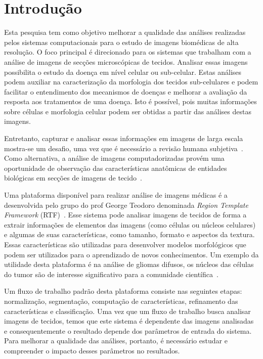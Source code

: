 \documentclass[a4paper,10pt]{article}
\begin{document}
	
	
\section{Introdução}\label{introducao}


Esta pesquisa tem como objetivo melhorar a qualidade das análises realizadas
pelos sistemas computacionais para o estudo de imagens biomédicas de alta
resolução. O foco principal é direcionado para os sistemas que trabalham com a
análise de imagens de secções microscópicas de tecidos. Analisar essas imagens
possibilita o estudo da doença em nível celular ou sub-celular. Estas análises
podem auxiliar na caracterização da morfologia dos tecidos sub-celulares e
podem facilitar o entendimento dos mecanismos de doenças e melhorar a avaliação
da resposta aos tratamentos de uma doença. Isto é possível, pois muitas
informações sobre células e morfologia celular podem ser obtidas a partir das
análises destas imagens.

Entretanto, capturar e analisar essas informações em imagens de larga escala
mostra-se um desafio, uma vez que é necessário a revisão humana
subjetiva~\cite{kong2011comprehensive}. Como alternativa, a análise de imagens
computadorizadas provém uma oportunidade de observação das características
anatômicas de entidades biológicas em secções de imagens de
tecido~\cite{kong2010texture}.

Uma plataforma disponível para realizar análise de imagens médicas é a
desenvolvida pelo grupo do prof George Teodoro denominada \textit{Region
Template Framework} (RTF)~\cite{teodoro2014region}. Esse sistema pode analisar
imagens de tecidos de forma a extrair informações de elementos das imagens
(como células ou núcleos celulares) e algumas de suas características, como
tamanho, formato e aspectos da textura. Essas características são utilizadas
para desenvolver modelos morfológicos que podem ser utilizados para o
aprendizado de novos conhecimentos. Um exemplo da utilidade desta plataforma é
na análise de gliomas difusos, os núcleos das células do tumor são de interesse
significativo para a comunidade científica~\cite{gupta2005clarifying}.

Um fluxo de trabalho padrão desta plataforma consiste nas seguintes etapas: normalização, segmentação, computação de características, refinamento das características e classificação. Uma vez que um fluxo de trabalho busca analisar imagens de tecidos, temos que este sistema é dependente das imagens analisadas e consequentemente o resultado depende dos parâmetros de entrada do sistema. Para melhorar a qualidade das análises, portanto, é necessário estudar e compreender o impacto desses parâmetros no resultados. 
\end{document}
